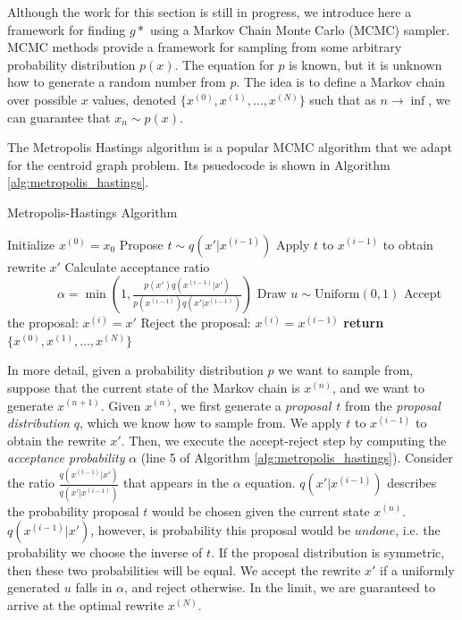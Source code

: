 \documentclass{article}
\begin{document}
Although the work for this section is still in progress, we introduce here a framework for finding $g*$ using a Markov Chain Monte Carlo (MCMC) sampler. MCMC methods provide a framework for sampling from some arbitrary probability distribution $p(x)$. The equation for $p$ is known, but it is unknown how to generate a random number from $p$. The idea is to define a Markov chain over possible $x$ values, denoted $\{x^{(0)}, x^{(1)}, \ldots, x^{(N)}\}$ such that as $n \to \inf$, we can guarantee that $x_n \sim p(x)$. 

The Metropolis Hastings algorithm is a popular MCMC algorithm that we adapt for the centroid graph problem. Its psuedocode is shown in Algorithm \ref{alg:metropolis_hastings}.

\begin{algorithm}
\caption{Metropolis-Hastings Algorithm}\label{alg:metropolis_hastings}
\begin{algorithmic}[1] %
    \State Initialize $x^{(0)} = x_0$
        \State Propose $t \sim q(x'|x^{(i-1)})$
        \State Apply $t$ to $x^{(i-1)}$ to obtain rewrite $x'$
        \State Calculate acceptance ratio \Statex $\qquad\qquad\alpha = \min\left(1, \frac{p(x')q(x^{(i-1)}|x')}{p(x^{(i-1)})q(x'|x^{(i-1)})}\right)$
        \State Draw $u \sim \text{Uniform}(0, 1)$
            \State Accept the proposal: $x^{(i)} = x'$
        \Else
            \State Reject the proposal: $x^{(i)} = x^{(i-1)}$
        \EndIf
    \EndFor
    \State \textbf{return} $\{x^{(0)}, x^{(1)}, \ldots, x^{(N)}\}$
\EndProcedure
\end{algorithmic}
\label{alg:metropolis_hastings}
\end{algorithm}

In more detail, given a probability distribution $p$ we want to sample from, suppose that the current state of the Markov chain is $x^{(n)}$, and we want to generate $x^{(n+1)}$. Given $x^{(n)}$, we first generate a $proposal$ $t$ from the \textit{proposal distribution} $q$, which we know how to sample from. We apply $t$ to $x^{(i-1)}$ to obtain the rewrite $x'$. Then, we execute the accept-reject step by computing the \textit{acceptance probability} $\alpha$ (line 5 of Algorithm \ref{alg:metropolis_hastings}). Consider the ratio $\frac{q(x^{(i-1)}|x')}{q(x'|x^{(i-1)})}$ that appears in the $\alpha$ equation. $q(x'|x^{(i-1)})$ describes the probability proposal $t$ would be chosen given the current state $x^{(n)}$. $q(x^{(i-1)}|x')$, however, is probability this proposal would be $undone$, i.e. the probability we choose the inverse of $t$. If the proposal distribution is symmetric, then these two probabilities will be equal. We accept the rewrite $x'$ if a uniformly generated $u$ falls in $\alpha$, and reject otherwise. In the limit, we are guaranteed to arrive at the optimal rewrite $x^{(N)}$.
\end{document}
